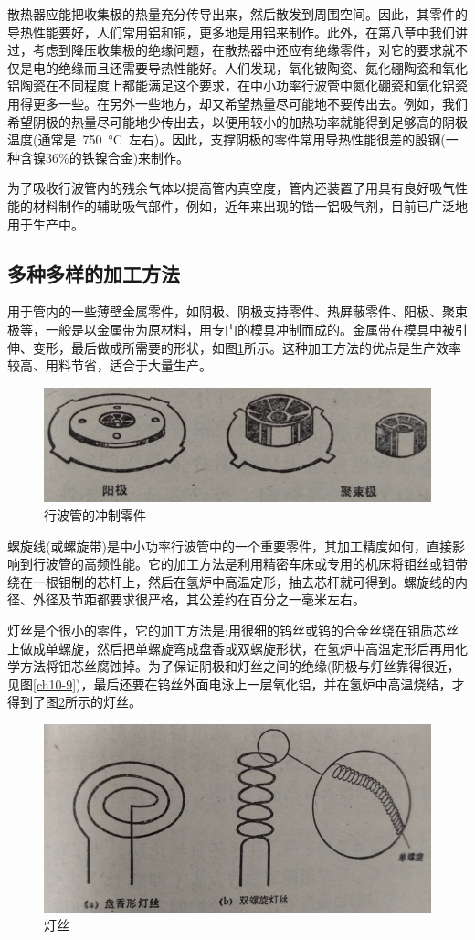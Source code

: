 散热器应能把收集极的热量充分传导出来，然后散发到周围空间。因此，其零件的导热性能要好，人们常用铝和铜，更多地是用铝来制作。此外，在第八章中我们讲过，考虑到降压收集极的绝缘问题，在散热器中还应有绝缘零件，对它的要求就不仅是电的绝缘而且还需要导热性能好。人们发现，氧化铍陶瓷、氮化硼陶瓷和氧化铝陶瓷在不同程度上都能满足这个要求，在中小功率行波管中氮化硼瓷和氧化铝瓷用得更多一些。在另外一些地方，却又希望热量尽可能地不要传出去。例如，我们希望阴极的热量尽可能地少传出去，以便用较小的加热功率就能得到足够高的阴极温度(通常是~\SI{750}{\degreeCelsius}~左右)。因此，支撑阴极的零件常用导热性能很差的殷钢(一种含镍36\%的铁镍合金)来制作。


为了吸收行波管内的残余气体以提高管内真空度，管内还装置了用具有良好吸气性能的材料制作的辅助吸气部件，例如，近年来出现的锆一铝吸气剂，目前已广泛地用于生产中。

\subsection{多种多样的加工方法}
用于管内的一些薄壁金属零件，如阴极、阴极支持零件、热屏蔽零件、阳极、聚束极等，一般是以金属带为原材料，用专门的模具冲制而成的。金属带在模具中被引伸、变形，最后做成所需要的形状，如图\ref{ch10-4}所示。这种加工方法的优点是生产效率较高、用料节省，适合于大量生产。
\begin{figure}[phtb]
	\centering
	\includegraphics[width=0.65\linewidth]{figure/ch10-4}
	\caption{ 行波管的冲制零件}
	\label{ch10-4}
\end{figure}

螺旋线(或螺旋带)是中小功率行波管中的一个重要零件，其加工精度如何，直接影响到行波管的高频性能。它的加工方法是利用精密车床或专用的机床将钼丝或钼带绕在一根钼制的芯杆上，然后在氢炉中高温定形，抽去芯杆就可得到。螺旋线的内径、外径及节距都要求很严格，其公差约在百分之一毫米左右。


灯丝是个很小的零件，它的加工方法是:用很细的钨丝或钨的合金丝绕在钼质芯丝上做成单螺旋，然后把单螺旋弯成盘香或双螺旋形状，在氢炉中高温定形后再用化学方法将钼芯丝腐蚀掉。为了保证阴极和灯丝之间的绝缘(阴极与灯丝靠得很近，见图\ref{ch10-9})，最后还要在钨丝外面电泳上一层氧化铝，并在氢炉中高温烧结，才得到了图\ref{ch10-5}所示的灯丝。
\begin{figure}[phtb]
	\centering
	\includegraphics[width=0.7\linewidth]{figure/ch10-5}
	\caption{ 灯丝}
	\label{ch10-5}
\end{figure}


